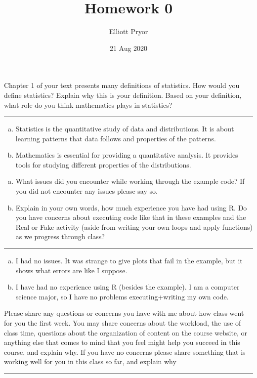 \documentclass[11pt]{article}
\title{Homework 0}
\author{Elliott Pryor}
\date{21 Aug 2020}
\begin{document}
\maketitle


Chapter 1 of your text presents many definitions of statistics. How would you define statistics? Explain why this is your definition. Based on your definition, what role do you think mathematics plays in statistics?
\hrule

\begin{enumerate}[a)]
	\item Statistics is the quantitative study of data and distributions. It is about learning patterns that data follows and properties of the patterns.
	\item Mathematics is essential for providing a quantitative analysis. It provides tools for studying different properties of the distributions. 
\end{enumerate}


\begin{enumerate}[a)]
	\item What issues did you encounter while working through the example code? If you did not encounter any issues please say so.
	\item Explain in your own words, how much experience you have had using R. Do you have concerns about executing code like that in these examples and the Real or Fake activity (aside from writing your own loops and apply functions) as we progress through class?
\end{enumerate}
\hrule

\begin{enumerate}[a)]
	\item I had no issues. It was strange to give plots that fail in the example, but it shows what errors are like I suppose.
	
	\item I have had no experience using R (besides the example). I am a computer science major, so I have no problems executing+writing my own code. 

\end{enumerate}


Please share any questions or concerns you have with me about how class went for you the first week. You may share concerns about the workload, the use of class time, questions about the organization of content on the course website, or anything else that comes to mind that you feel might help you succeed in this course, and explain why. If you have no concerns please share something that is working well for you in this class so far, and explain why
\hrule
\end{document}
